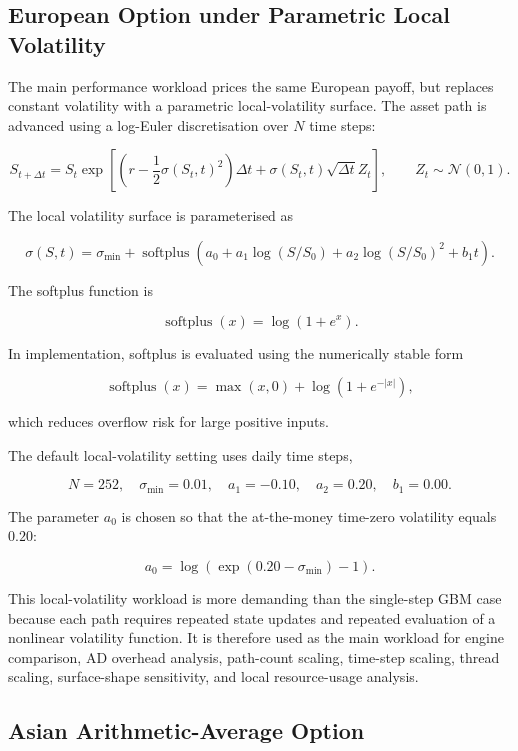\subsection{European Option under Parametric Local Volatility}
\label{sec:exp-workload-localvol}

The main performance workload prices the same European payoff, but replaces
constant volatility with a parametric local-volatility surface.  The asset
path is advanced using a log-Euler discretisation over \(N\) time steps:

\[
    S_{t+\Delta t}
    =
    S_t
    \exp\!\left[
        \left(r - \frac{1}{2}\sigma(S_t,t)^2\right)\Delta t
        + \sigma(S_t,t)\sqrt{\Delta t}Z_t
    \right],
    \qquad
    Z_t \sim \mathcal{N}(0,1).
\]

The local volatility surface is parameterised as

\[
    \sigma(S,t)
    =
    \sigma_{\min}
    +
    \operatorname{softplus}
    \left(
        a_0
        + a_1 \log(S/S_0)
        + a_2 \log(S/S_0)^2
        + b_1 t
    \right).
\]

The softplus function is

\[
    \operatorname{softplus}(x)
    =
    \log(1 + e^x).
\]

In implementation, softplus is evaluated using the numerically stable form

\[
    \operatorname{softplus}(x)
    =
    \max(x,0) + \log(1 + e^{-|x|}),
\]

which reduces overflow risk for large positive inputs.

The default local-volatility setting uses daily time steps,

\[
    N = 252,\quad
    \sigma_{\min}=0.01,\quad
    a_1=-0.10,\quad
    a_2=0.20,\quad
    b_1=0.00.
\]

The parameter \(a_0\) is chosen so that the at-the-money time-zero volatility
equals \(0.20\):

\[
    a_0
    =
    \log\!\left(
        \exp(0.20-\sigma_{\min}) - 1
    \right).
\]

This local-volatility workload is more demanding than the single-step GBM
case because each path requires repeated state updates and repeated
evaluation of a nonlinear volatility function.  It is therefore used as the
main workload for engine comparison, AD overhead analysis, path-count
scaling, time-step scaling, thread scaling, surface-shape sensitivity, and
local resource-usage analysis.

\subsection{Asian Arithmetic-Average Option}
\label{sec:exp-workload-asian}

